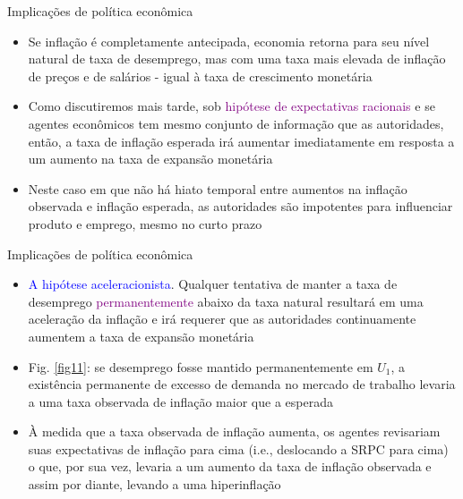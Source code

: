 \documentclass[10pt]{beamer}
\begin{document}
\begin{frame}{Implicações de política econômica}
    \begin{itemize}
        \item Se inflação é completamente antecipada, economia retorna para seu nível natural de taxa de desemprego, mas com uma taxa mais elevada de inflação de preços e de salários - igual à taxa de crescimento monetária
        \bigskip
        \item Como discutiremos mais tarde, sob \textcolor{purple}{hipótese de expectativas racionais} e se agentes econômicos tem mesmo conjunto de informação que as autoridades, então, a taxa de inflação esperada irá aumentar imediatamente em resposta a um aumento na taxa de expansão monetária
        \bigskip
        \item Neste caso em que não há hiato temporal entre aumentos na inflação observada e inflação esperada, as autoridades são impotentes para influenciar produto e emprego, mesmo no curto prazo
    \end{itemize}    
\end{frame}

\begin{frame}{Implicações de política econômica}
    \begin{itemize}
        \item \textcolor{blue}{A hipótese aceleracionista}. Qualquer tentativa de manter a taxa de desemprego \textcolor{purple}{permanentemente} abaixo da taxa natural resultará em uma aceleração da inflação e irá requerer que as autoridades continuamente aumentem a taxa de expansão monetária
        \bigskip
        \item Fig. \ref{fig11}: se desemprego fosse mantido permanentemente em $U_1$, a existência permanente de excesso de demanda no mercado de trabalho levaria a uma taxa observada de inflação maior que a esperada
        \bigskip
        \item À medida que a taxa observada de inflação aumenta, os agentes revisariam suas expectativas de inflação para cima (i.e., deslocando a SRPC para cima) o que, por sua vez, levaria a um aumento da taxa de inflação observada e assim por diante, levando a uma hiperinflação
    \end{itemize}    
\end{frame}
\end{document}
